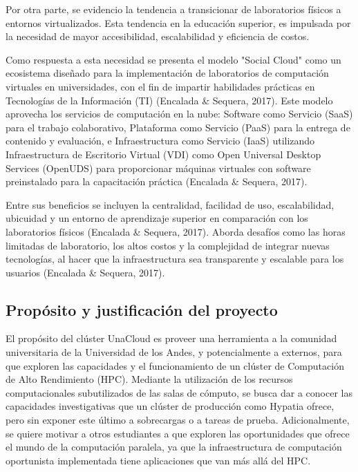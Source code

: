 Por otra parte, se evidencio la tendencia a transicionar de laboratorios físicos a entornos virtualizados. Esta tendencia en la educación superior, es impulsada por la necesidad de mayor accesibilidad, escalabilidad y eficiencia de costos.

Como respuesta a esta necesidad se presenta el modelo "Social Cloud" como un ecosistema diseñado para la implementación de laboratorios de computación virtuales en universidades, con el fin de impartir habilidades prácticas en Tecnologías de la Información (TI) (Encalada & Sequera, 2017). Este modelo aprovecha los servicios de computación en la nube: Software como Servicio (SaaS) para el trabajo colaborativo, Plataforma como Servicio (PaaS) para la entrega de contenido y evaluación, e Infraestructura como Servicio (IaaS) utilizando Infraestructura de Escritorio Virtual (VDI) como Open Universal Desktop Services (OpenUDS) para proporcionar máquinas virtuales con software preinstalado para la capacitación práctica (Encalada & Sequera, 2017). 

Entre sus beneficios se incluyen la centralidad, facilidad de uso, escalabilidad, ubicuidad y un entorno de aprendizaje superior en comparación con los laboratorios físicos (Encalada & Sequera, 2017). Aborda desafíos como las horas limitadas de laboratorio, los altos costos y la complejidad de integrar nuevas tecnologías, al hacer que la infraestructura sea transparente y escalable para los usuarios (Encalada & Sequera, 2017). 

\subsection{Propósito y justificación del proyecto}

El propósito del clúster UnaCloud es proveer una herramienta a la comunidad universitaria de la Universidad de los Andes, y potencialmente a externos, para que exploren las capacidades y el funcionamiento de un clúster de Computación de Alto Rendimiento (HPC). Mediante la utilización de los recursos computacionales subutilizados de las salas de cómputo, se busca dar a conocer las capacidades investigativas que un clúster de producción como Hypatia ofrece, pero sin exponer este último a sobrecargas o a tareas de prueba. Adicionalmente, se quiere motivar a otros estudiantes a que exploren las oportunidades que ofrece el mundo de la computación paralela, ya que la infraestructura de computación oportunista implementada tiene aplicaciones que van más allá del HPC.

